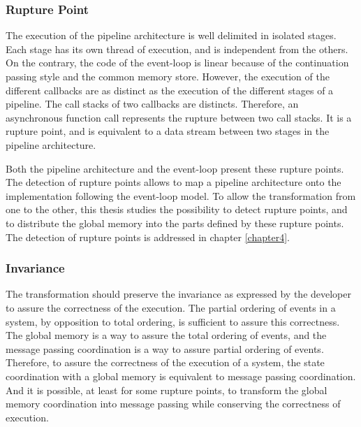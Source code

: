 \subsubsection{Rupture Point}

The execution of the pipeline architecture is well delimited in isolated stages.
Each stage has its own thread of execution, and is independent from the others.
On the contrary, the code of the event-loop is linear because of the continuation passing style and the common memory store.
However, the execution of the different callbacks are as distinct as the execution of the different stages of a pipeline.
The call stacks of two callbacks are distincts.
Therefore, an asynchronous function call represents the rupture between two call stacks.
It is a rupture point, and is equivalent to a data stream between two stages in the pipeline architecture.

Both the pipeline architecture and the event-loop present these rupture points.
The detection of rupture points allows to map a pipeline architecture onto the implementation following the event-loop model.
To allow the transformation from one to the other, this thesis studies the possibility to detect rupture points, and to distribute the global memory into the parts defined by these rupture points.
The detection of rupture points is addressed in chapter \ref{chapter4}.

\subsubsection{Invariance}


The transformation should preserve the invariance as expressed by the developer to assure the correctness of the execution.
The partial ordering of events in a system, by opposition to total ordering, is sufficient to assure this correctness.
The global memory is a way to assure the total ordering of events, and the message passing coordination is a way to assure partial ordering of events.
Therefore, to assure the correctness of the execution of a system, the state coordination with a global memory is equivalent to message passing coordination.
And it is possible, at least for some rupture points, to transform the global memory coordination into message passing while conserving the correctness of execution.

